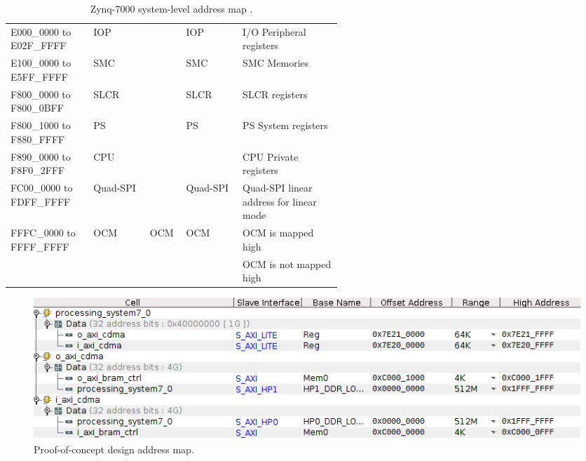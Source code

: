 \begin{appendices}
\begin{table}
\begin{tabular}{p{0.25\linewidth}lllp{0.3\linewidth}}
E000\_0000 to E02F\_FFFF                  & IOP          &         & IOP               & I/O Peripheral registers                              \\
E100\_0000 to E5FF\_FFFF                  & SMC          &         & SMC               & SMC Memories                                          \\
F800\_0000 to F800\_0BFF                  & SLCR         &         & SLCR              & SLCR registers                                        \\
F800\_1000 to F880\_FFFF                  & PS           &         & PS                & PS System registers                                   \\
F890\_0000 to F8F0\_2FFF                  & CPU          &         &                   & CPU Private registers                                 \\
FC00\_0000 to FDFF\_FFFF                  & Quad-SPI     &         & Quad-SPI          & Quad-SPI linear address for linear mode               \\
\multirow{2}{*}{FFFC\_0000 to FFFF\_FFFF} & OCM          & OCM     & OCM               & OCM is mapped high                                    \\
                                          &              &         &                   & OCM is not mapped high                               
\end{tabular}
\caption{Zynq-7000 system-level address map \cite{xilinx:ug585}.}
\label{table:zynq_address_map}
\end{table}

\begin{figure}
  \centering
  \includegraphics[width=1\textwidth]{./img/address_map.png}
  \caption{Proof-of-concept design address map.}
  \label{fig:poc_address_map}
\end{figure}


\end{appendices}
